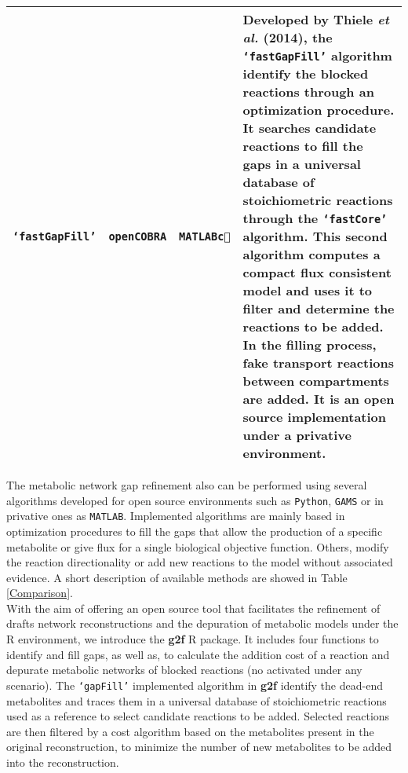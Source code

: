 \begin{center}
\begin{longtable}{|m{3.6cm}|c|c|m{6.7cm}|}
\hline
\texttt{`fastGapFill'} \cite{Thiele2014gf}&\texttt{openCOBRA}&\texttt{MATLAB\textcircled{c}} & {Developed by Thiele \textit{et al.} (2014), the \texttt{`fastGapFill'} algorithm identify the blocked reactions through an optimization procedure. It searches candidate reactions to fill the gaps in a universal database of stoichiometric reactions through the \texttt{`fastCore'} algorithm. This second algorithm computes a compact flux consistent model and uses it to filter and determine the reactions to be added. In the filling process, fake transport reactions between compartments are added. It is an open source implementation under a privative environment.}\\
\hline
\end{longtable}
\end{center}

The metabolic network gap refinement also can be performed using several algorithms developed for open source environments such as \texttt{Python}, \texttt{GAMS} or in privative ones as \texttt{MATLAB}. Implemented algorithms are mainly based in optimization procedures to fill the gaps that allow the production of a specific metabolite or give flux for a single biological objective function. Others, modify the reaction directionality or add new reactions to the model without associated evidence. A short description of available methods are showed in Table \ref{Comparison}.\\

With the aim of offering an open source tool that facilitates the refinement of drafts network reconstructions and the depuration of metabolic models under the R environment, we introduce the \textbf{g2f} R package. It includes four functions to identify and fill gaps, as well as, to calculate the addition cost of a reaction and depurate metabolic networks of blocked reactions (no activated under any scenario). The \texttt{`gapFill'} implemented algorithm in \textbf{g2f} identify the dead-end metabolites and traces them in a universal database of stoichiometric reactions used as a reference to select candidate reactions to be added. Selected reactions are then filtered by a cost algorithm based on the metabolites present in the original reconstruction, to minimize the number of new metabolites to be added into the reconstruction.\\
